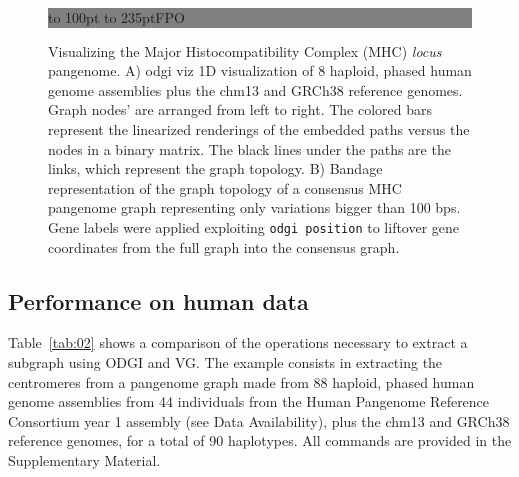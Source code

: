 \documentclass{bioinfo}
\begin{document}
    \begin{figure}[!tpb]%
        \fboxsep=0pt\colorbox{gray}{
            \begin{minipage}[t]{235pt}
                \vbox to 100pt{
                    \vfill\hbox to
                    235pt{\hfill\fontsize{24pt}{24pt}\selectfont FPO\hfill}
                    \vfill
                }
            \end{minipage}}
        \caption{
            Visualizing the Major Histocompatibility Complex (MHC) \textit{locus} pangenome. A) odgi viz 1D
            visualization of 8 haploid, phased human genome assemblies plus the chm13 and GRCh38 reference genomes.
            Graph nodes’ are arranged from left to right. The colored bars represent the linearized renderings of the
            embedded paths versus the nodes in a binary matrix. The black lines under the paths are the links, which
            represent the graph topology. B) Bandage~\citep{26099265} representation of the graph topology of a
            consensus MHC pangenome graph representing only variations bigger than 100 bps. Gene labels were applied
            exploiting \texttt{odgi position} to liftover gene coordinates from the full graph into the consensus
            graph.
        }\label{fig:01}
    \end{figure}

    \subsection{Performance on human data}

    Table~\ref{tab:02} shows a comparison of the operations necessary to extract a subgraph using ODGI and VG. The
    example consists in extracting the centromeres from a pangenome graph made from 88 haploid, phased human genome
    assemblies from 44 individuals from the Human Pangenome Reference Consortium year 1 assembly (see Data
    Availability), plus the chm13 and GRCh38 reference genomes, for a total of 90 haplotypes. All commands are provided
    in the Supplementary Material.
\end{document}
